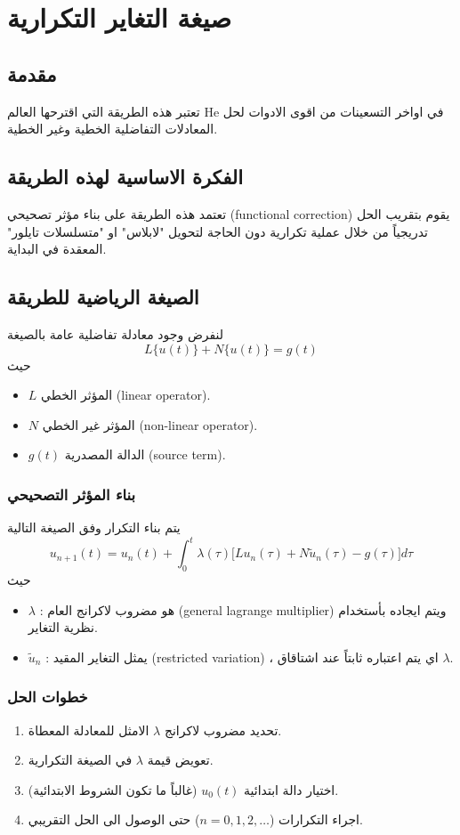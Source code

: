 \chapter{صيغة التغاير التكرارية}

\section{مقدمة}

تعتبر هذه الطريقة التي اقترحها العالم He في اواخر التسعينات من اقوى الادوات لحل المعادلات التفاضلية الخطية وغير الخطية.

\section{الفكرة الاساسية لهذه الطريقة}
تعتمد هذه الطريقة على بناء مؤثر تصحيحي 
(functional correction)
يقوم بتقريب الحل تدريجياً من خلال عملية تكرارية دون الحاجة لتحويل "لابلاس" او "متسلسلات تايلور" المعقدة في البداية.

\section{الصيغة الرياضية للطريقة}
لنفرض وجود معادلة تفاضلية عامة بالصيغة
\[
L\{u(t)\} + N\{u(t)\} = g(t)
\]
حيث
\begin{itemize}[nosep]
	\item $L$ المؤثر الخطي (linear operator).
	\item $N$ المؤثر غير الخطي (non-linear operator).
	\item $g(t)$ الدالة المصدرية (source term).
\end{itemize}

\subsection*{بناء المؤثر التصحيحي}
يتم بناء التكرار وفق الصيغة التالية
\[
u_{n+1}(t) = u_n(t) + \int_{0}^{t} \lambda(\tau) \Big[L u_n(\tau) + N \tilde{u}_n(\tau) - g(\tau)\Big] d\tau
\]
حيث
\begin{itemize}[nosep]
	\item $\lambda$ : هو مضروب لاكرانج العام 
	(general lagrange multiplier) ويتم ايجاده بأستخدام نظرية التغاير.
	
	\item $\tilde{u}_n$ : يمثل التغاير المقيد 
	(restricted variation) ، اي يتم اعتباره ثابتاً عند اشتاقاق $\lambda$.
\end{itemize}

\subsection*{خطوات الحل}
\begin{enumerate}[label=\textbf{\arabic*.}]
	\item تحديد مضروب لاكرانج $\lambda$ الامثل للمعادلة المعطاة.
	\item تعويض قيمة $\lambda$ في الصيغة التكرارية.
	\item اختيار دالة ابتدائية $u_0(t)$ (غالباً ما تكون الشروط الابتدائية).
	\item اجراء التكرارات ($n=0,1,2,\dots$) حتى الوصول الى الحل التقريبي.
\end{enumerate}

